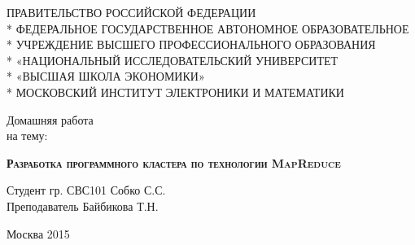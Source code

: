 \documentclass[document.tex]{subfiles}
\begin{document}
\newpage
{}

\begin{center}
  \begin{small}
    ПРАВИТЕЛЬСТВО РОССИЙСКОЙ ФЕДЕРАЦИИ \\*
    ФЕДЕРАЛЬНОЕ ГОСУДАРСТВЕННОЕ АВТОНОМНОЕ ОБРАЗОВАТЕЛЬНОЕ \\*
    УЧРЕЖДЕНИЕ ВЫСШЕГО ПРОФЕССИОНАЛЬНОГО ОБРАЗОВАНИЯ \\*
    «НАЦИОНАЛЬНЫЙ ИССЛЕДОВАТЕЛЬСКИЙ УНИВЕРСИТЕТ \\*
    «ВЫСШАЯ ШКОЛА ЭКОНОМИКИ» \\*
    \vspace{1em}
    МОСКОВСКИЙ ИНСТИТУТ ЭЛЕКТРОНИКИ И МАТЕМАТИКИ
    \vspace{1em}
  \end{small}
\end{center}

\vspace{10em}
\vspace{8em}

\begin{center}
\Large Домашняя работа \\ на тему:
\end{center}

\vspace{2.5em}

\begin{center}
\textsc{\textbf{Разработка программного кластера \linebreak
по технологии MapReduce}}
\end{center}

\vspace{13em}

\begin{flushleft}
Студент гр. СВС101 \hrulefill Собко С.С. \\
\vspace{1.5em}
Преподаватель \hrulefill Байбикова Т.Н.
\end{flushleft}

\vspace{\fill}

\begin{center}
Москва 2015
\end{center}
\end{document}
